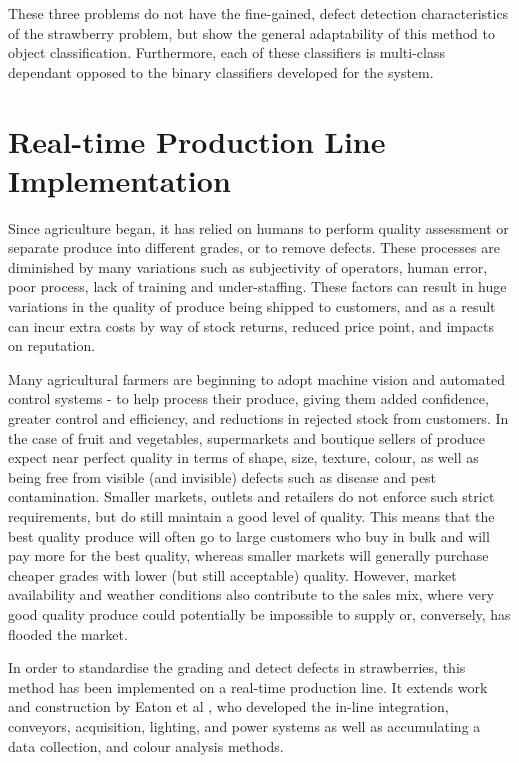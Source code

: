 \documentclass[conference]{IEEEtran}
\begin{document}
These three problems do not have the fine-gained, defect detection characteristics of the strawberry problem, but show the general adaptability of this method to object classification. Furthermore, each of these classifiers is multi-class dependant opposed to the binary classifiers developed for the system. 




\section{Real-time Production Line Implementation}

Since agriculture began, it has relied on humans to perform quality assessment or separate produce into different grades, or to remove defects. These processes are diminished by many variations such as subjectivity of operators, human error, poor process, lack of training and under-staffing. These factors can result in huge variations in the quality of produce being shipped to customers, and as a result can incur extra costs by way of stock returns, reduced price point, and impacts on reputation.

Many agricultural farmers are beginning to adopt machine vision and automated control systems \cite{saldana} - \cite{costa} to help process their produce, giving them added confidence, greater control and efficiency, and reductions in rejected stock from customers. In the case of fruit and vegetables, supermarkets and boutique sellers of produce expect near perfect quality in terms of shape, size, texture, colour, as well as being free from visible (and invisible) defects such as disease and pest contamination. Smaller markets, outlets and retailers do not enforce such strict requirements, but do still maintain a good level of quality. This means that the best quality produce will often go to large customers who buy in bulk and will pay more for the best quality, whereas smaller markets will generally purchase cheaper grades with lower (but still acceptable) quality. However, market availability and weather conditions also contribute to the sales mix, where very good quality produce could potentially be impossible to supply or, conversely, has flooded the market.

In order to standardise the grading and detect defects in strawberries, this method has been implemented on a real-time production line. It extends work and construction by Eaton et al \cite{eaton1}, \cite{eaton2} who developed the in-line integration, conveyors, acquisition, lighting, and power systems as well as accumulating a data collection, and colour analysis methods.
\end{document}
